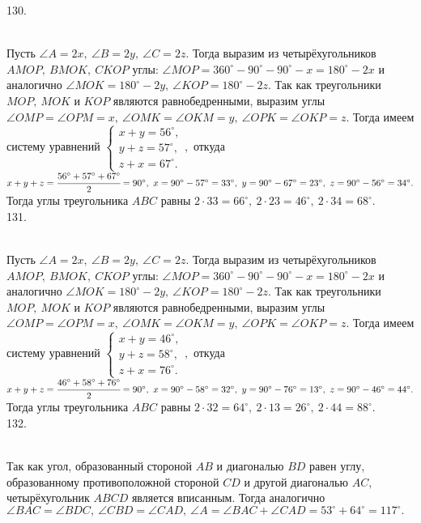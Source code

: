 130. \begin{figure}[ht!]
\end{figure}\\
Пусть $\angle A=2x,\ \angle B=2y,\ \angle C=2z.$ Тогда выразим из четырёхугольников $AMOP,\ BMOK,\ CKOP$ углы: $\angle MOP=360^\circ-90^\circ-90^\circ-x=180^\circ-2x$ и аналогично $\angle MOK=180^\circ-2y,\ \angle KOP=180^\circ-2z.$ Так как треугольники $MOP,\ MOK$ и $KOP$ являются равнобедренными, выразим углы $\angle OMP=\angle OPM=x,\ \angle OMK=\angle OKM=y,\ \angle OPK=\angle OKP=z.$ Тогда имеем систему уравнений $\begin{cases} x+y=56^\circ,\\ y+z=57^\circ,\\ z+x=67^\circ.\end{cases},$ откуда $x+y+z=\cfrac{56^\circ+57^\circ+67^\circ}{2}=90^\circ,\ x=90^\circ-57^\circ=33^\circ,\ y=90^\circ-67^\circ=23^\circ,\ z=90^\circ-56^\circ=34^\circ.$ Тогда углы треугольника $ABC$ равны $2\cdot33=66^\circ,\ 2\cdot23=46^\circ,\ 2\cdot34=68^\circ.$\\
131. \begin{figure}[ht!]
\end{figure}\\
Пусть $\angle A=2x,\ \angle B=2y,\ \angle C=2z.$ Тогда выразим из четырёхугольников $AMOP,\ BMOK,\ CKOP$ углы: $\angle MOP=360^\circ-90^\circ-90^\circ-x=180^\circ-2x$ и аналогично $\angle MOK=180^\circ-2y,\ \angle KOP=180^\circ-2z.$ Так как треугольники $MOP,\ MOK$ и $KOP$ являются равнобедренными, выразим углы $\angle OMP=\angle OPM=x,\ \angle OMK=\angle OKM=y,\ \angle OPK=\angle OKP=z.$ Тогда имеем систему уравнений $\begin{cases} x+y=46^\circ,\\ y+z=58^\circ,\\ z+x=76^\circ.\end{cases},$ откуда $x+y+z=\cfrac{46^\circ+58^\circ+76^\circ}{2}=90^\circ,\ x=90^\circ-58^\circ=32^\circ,\ y=90^\circ-76^\circ=13^\circ,\ z=90^\circ-46^\circ=44^\circ.$ Тогда углы треугольника $ABC$ равны $2\cdot32=64^\circ,\ 2\cdot13=26^\circ,\ 2\cdot44=88^\circ.$\\
132. \begin{figure}[ht!]
\end{figure}\\
Так как угол, образованный стороной $AB$ и диагональю $BD$ равен углу, образованному противоположной стороной $CD$ и другой диагональю $AC,$ четырёхугольник $ABCD$ является вписанным. Тогда аналогично $\angle BAC=\angle BDC,\ \angle CBD=\angle CAD,\ \angle A=\angle BAC+\angle CAD=53^\circ+64^\circ=117^\circ.$\\
